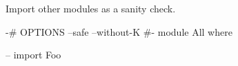 Import other modules as a sanity check.

\begin{code}
{-# OPTIONS --safe --without-K #-}
module All where

-- import Foo
\end{code}
